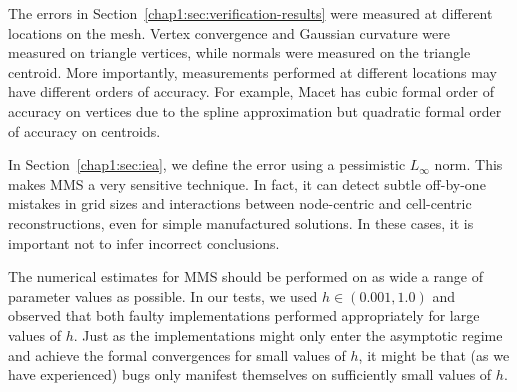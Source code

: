 The errors in Section~\ref{chap1:sec:verification-results} were
measured at different locations on the mesh. Vertex convergence and
Gaussian curvature were measured on triangle vertices, while normals
were measured on the triangle centroid. 
More importantly, measurements
performed at different locations may have different orders of
accuracy. For example,
Macet has cubic formal order of accuracy on vertices due to the spline approximation
but quadratic formal order of accuracy on centroids.

In Section~\ref{chap1:sec:iea}, we define the error using a pessimistic
$L_\infty$ norm. This makes MMS a very sensitive technique. In
fact, it can detect subtle off-by-one mistakes in grid sizes
and interactions between node-centric and cell-centric
reconstructions,
even for simple manufactured solutions. In
these cases, it is important not to infer incorrect conclusions. 

%

The numerical estimates for MMS should be performed on as wide a range
of parameter values as possible. In our tests, we used 
$h \in (0.001, 1.0)$ and observed that both faulty implementations
performed appropriately for large values of $h$. Just as the
implementations might only enter the asymptotic regime and achieve the
formal convergences for small values of $h$, it might be that (as we
have experienced) bugs only manifest themselves on sufficiently small
values of $h$.


